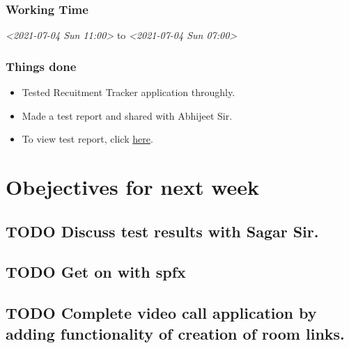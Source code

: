 \documentclass[11pt]{article}
\begin{document}
\subsubsection*{Working Time}
\label{sec:org5cf9a21}
\textit{<2021-07-04 Sun 11:00> } to \textit{<2021-07-04 Sun 07:00>}

\subsubsection*{Things done}
\label{sec:orgb0b7c92}
\begin{itemize}
\item Tested Recuitment Tracker application throughly.
\item Made a test report and shared with Abhijeet Sir.
\item To view test report, click \href{https://1drv.ms/u/s!ArQqOdh2LFJagS9y8mSSPYZvP0-T}{here}.
\end{itemize}

\section*{Obejectives for next week}
\label{sec:org060c610}

\subsection*{{\bfseries\sffamily TODO} Discuss test results with Sagar Sir.}
\label{sec:org7724f8d}
\subsection*{{\bfseries\sffamily TODO} Get on with spfx}
\label{sec:org7015fec}
\subsection*{{\bfseries\sffamily TODO} Complete video call application by adding functionality of creation of room links.}
\label{sec:org4b8f62b}
\end{document}
